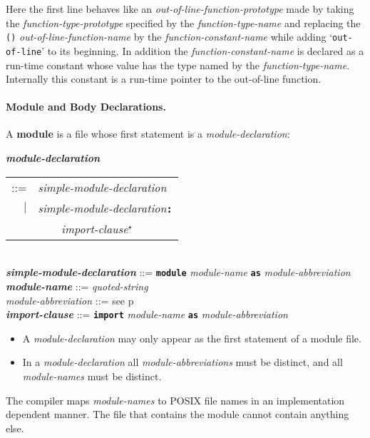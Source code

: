 \documentclass[12pt]{article}
\newcommand{\subsubsubsection}[1]{\paragraph[#1]{#1.}}
\newcommand{\TT}[1]{{\tt \bfseries #1}}
\newcommand{\STAR}{{\Large $^\star$}}
\newcommand{\key}[1]{{\rm \bfseries #1}}
\newcommand{\ttkey}[1]{{\tt \bfseries #1}}
\newcommand{\emkey}[1]{{\em \bfseries #1}}
\newcommand{\pagref}[1]{p\pageref{#1}}
\newenvironment{indpar}[1][0.3in]%
	{\begin{list}{}%
		     {\setlength{\itemsep}{0in}%
		      \setlength{\topsep}{0in}%
		      \setlength{\parsep}{1ex}%
		      \setlength{\labelwidth}{#1}%
		      \setlength{\leftmargin}{#1}%
		      \addtolength{\leftmargin}{\labelsep}}%
	 \item}%
	{\end{list}}
\begin{document}
Here the first line behaves like an {\em out-of-line-function-prototype}
made by taking the {\em function-type-prototype} specified by the
{\em function-type-name} and replacing the {\tt ()}
{\em out-of-line-function-name} by the {\em function-constant-name}
while adding `{\tt out-of-line}' to its beginning.  In addition
the {\em function-constant-name} is declared as a run-time constant whose
value has the type named by the {\em function-type-name}.
Internally this constant is a run-time pointer to the out-of-line function.



\subsubsubsection{Module and Body Declarations}
\label{MODULE-AND-BODY-DECLARATIONS}

A \key{module} is a file whose first statement is a {\em module-declaration}:

\begin{indpar}
\emkey{module-declaration}\label{MODULE-DECLARATION}
    \begin{tabular}[t]{rl}
    ::= & {\em simple-module-declaration} \\
    $|$ & {\em simple-module-declaration}\TT{:} \\
	& \TT{~~~~}{\em import-clause}\STAR{} \\
    \end{tabular} \\
\emkey{simple-module-declaration} ::= \TT{module} {\em module-name}
        \TT{as} {\em module-abbreviation} \\
\emkey{module-name}\label{MODULE-NAME} ::= {\em quoted-string} \\
{\em module-abbreviation} ::= see \pagref{MODULE-ABBREVIATION} \\
\emkey{import-clause}\label{IMPORT-CLAUSE}
    ::= \ttkey{import} {\em module-name} \TT{as} {\em module-abbreviation}

\begin{itemize}

\item
A {\em module-declaration} may only appear as the first statement
of a module file.

\item
In a {\em module-declaration} all {\em module-abbreviations} must be
distinct, and all {\em module-names} must be distinct.
\end{itemize}
\end{indpar}

The compiler maps {\em module-names} to POSIX file names in an
implementation dependent manner.  The file that contains the
module cannot contain anything else.
\end{document}
